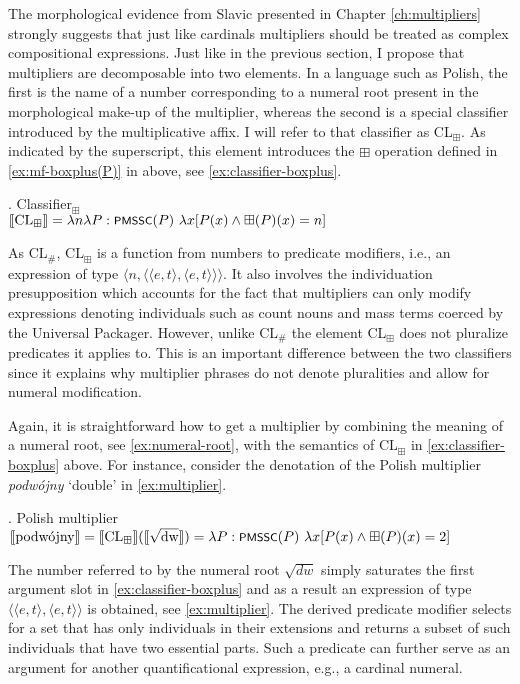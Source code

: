 	The morphological evidence from Slavic presented in Chapter \ref{ch:multipliers} strongly suggests that just like cardinals multipliers should be treated as complex compositional expressions. Just like in the previous section, I propose that multipliers are decomposable into two elements. In a language such as Polish, the first is the name of a number corresponding to a numeral root present in the morphological make-up of the multiplier, whereas the second is a special classifier introduced by the multiplicative affix. I will refer to that classifier as CL$_\boxplus$. As indicated by the superscript, this element introduces the $\boxplus$ operation defined in \ref{ex:mf-boxplus(P)} in  above, see \ref{ex:classifier-boxplus}. 
	
	\ex. Classifier$_\boxplus$\\
	$\llbracket \text{CL}_\boxplus\rrbracket = \lambda n \lambda P : \cnst{pmssc}(P)\ \lambda x [P(x) \wedge \boxplus(P)(x) = n]$\label{ex:classifier-boxplus}
	
	As CL$_\#$, CL$_\boxplus$ is a function from numbers to predicate modifiers, i.e., an expression of type $\langle n,\langle\langle e,t\rangle,\langle e,t\rangle\rangle\rangle$. It also involves the individuation presupposition which accounts for the fact that multipliers can only modify expressions denoting  individuals such as count nouns and mass terms coerced by the Universal Packager. However, unlike CL$_\#$ the element CL$_\boxplus$ does not pluralize predicates it applies to. This is an important difference between the two classifiers since it explains why multiplier phrases do not denote pluralities and allow for numeral modification.
	
	Again, it is straightforward how to get a multiplier by combining the meaning of a numeral root, see \ref{ex:numeral-root}, with the semantics of CL$_\boxplus$ in \ref{ex:classifier-boxplus} above. For instance, consider the denotation of the Polish multiplier \textit{podwójny} `double' in \ref{ex:multiplier}.  
	
	\ex. Polish multiplier\\
	$\llbracket \text{podwójny} \rrbracket = \llbracket \text{CL}_\boxplus \rrbracket(\llbracket \sqrt{\text{dw}} \rrbracket) = \lambda P : \cnst{pmssc}(P)\ \lambda x [P(x) \wedge \boxplus(P)(x) = 2]$\label{ex:multiplier}
	
	The number referred to by the numeral root $\sqrt{\textit{dw}}$ simply saturates the first argument slot in \ref{ex:classifier-boxplus} and as a result an expression of type $\langle\langle e,t\rangle,\langle e,t\rangle\rangle$ is obtained, see \ref{ex:multiplier}. The derived predicate modifier selects for a set that has only  individuals in their extensions and returns a subset of such  individuals that have two essential parts. Such a predicate can further serve as an argument for another quantificational expression, e.g., a cardinal numeral.
	
